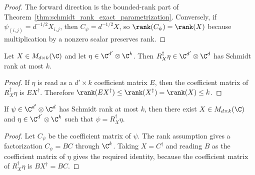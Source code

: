 \begin{proof}
    \leanok
    The forward direction is the bounded-rank part of
    Theorem~\ref{thm:schmidt_rank_exact_parametrization}. Conversely,
    if $\psi_{(i,j)}=d^{-1/2}X_{i,j}$, then
    $C_\psi=d^{-1/2}X$, so $\rank(C_\psi)=\rank(X)$ because multiplication
    by a nonzero scalar preserves rank.
\end{proof}

\begin{lemma}
    \label{lem:right_tensor_adjoint_schmidt_rank}
    \leanok
    Let $X\in M_{d\times k}(\C)$ and let
    $\eta\in\C^{d'}\otimes\C^k$. Then
    $R_X^\dagger\eta\in\C^{d'}\otimes\C^d$ has Schmidt rank at most $k$.
\end{lemma}

\begin{proof}
    \leanok
    If $\eta$ is read as a $d'\times k$ coefficient matrix $E$, then the
    coefficient matrix of $R_X^\dagger\eta$ is $EX^\dagger$. Therefore
    $\rank(EX^\dagger)\le\rank(X^\dagger)=\rank(X)\le k$.
\end{proof}

\begin{lemma}
    \label{lem:right_tensor_adjoint_schmidt_rank_representatives}
    \leanok
    If $\psi\in\C^{d'}\otimes\C^d$ has Schmidt rank at most $k$, then there
    exist $X\in M_{d\times k}(\C)$ and
    $\eta\in\C^{d'}\otimes\C^k$ such that
    $\psi=R_X^\dagger\eta$.
\end{lemma}

\begin{proof}
    \leanok
    Let $C_\psi$ be the coefficient matrix of $\psi$. The rank assumption
    gives a factorization $C_\psi=BC$ through $\C^k$. Taking
    $X=C^\dagger$ and reading $B$ as the coefficient matrix of $\eta$ gives
    the required identity, because the coefficient matrix of
    $R_X^\dagger\eta$ is $BX^\dagger=BC$.
\end{proof}

